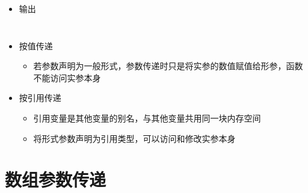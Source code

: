 \begin{frame}[fragile]
{{\begin{columns}[onlytextwidth,T]
\begin{tikzpicture}
                \end{tikzpicture}

                \begin{itemize}
                    \item<7> 输出\\
                \end{itemize}

            \end{columns}
        }{
            \begin{itemize}
                \item 按值传递

                \begin{itemize}
                    \item 若参数声明为一般形式，参数传递时只是将实参的数值赋值给形参，函数不能访问实参本身
                \end{itemize}
                
                \item 按引用传递

                \begin{itemize}
                    \item 引用变量是其他变量的别名，与其他变量共用同一块内存空间
                    \item 将形式参数声明为引用类型，可以访问和修改实参本身
                \end{itemize}
                
            \end{itemize}
        }
    }
        
\end{frame}

\section{数组参数传递}

